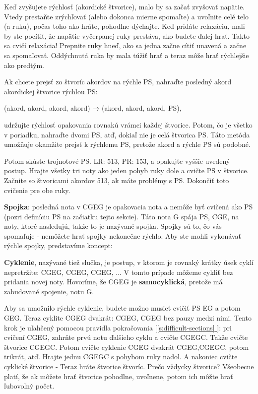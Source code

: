\documentclass[11pt,a4paper]{book}
\newcommand*{\fullref}[1]{\hyperref[{#1}]{\ref*{#1} \nameref*{#1}}} %
\newcommand*{\fullrefp}[1]{[\fullref{#1}]} %
\begin{document}
Keď zvyšujete rýchlosť (akordické štvorice), malo by sa začať zvyšovať napätie. Vtedy prestaňte zrýchľovať (alebo dokonca mierne spomaľte) a uvoľnite celé telo (a ruku), počas toho ako hráte, pohodlne dýchajte. Keď pridáte relaxáciu, mali by ste pocítiť, že napätie vyčerpanej ruky prestáva, ako budete ďalej hrať. Takto sa cvičí relaxácia! Prepnite ruky hneď, ako sa jedna začne cítiť unavená a začne sa spomaľovať. Oddýchnutá ruka by mala túžiť hrať a teraz môže hrať rýchlejšie ako predtým.

Ak chcete prejsť zo štvoríc akordov na rýchle PS, nahraďte posledný akord akordickej štvorice rýchlou PS:

(akord, akord, akord, akord) → (akord, akord, akord, PS),

udržujte rýchlosť opakovania rovnakú vrámci každej štvorice. Potom, čo je všetko v poriadku, nahraďte dvomi PS, atď, dokiaľ nie je celá štvorica PS. Táto metóda umožňuje okamžite prejsť k rýchlemu PS, pretože akord a rýchle PS sú podobné.

Potom skúste trojnotové PS. ĽR: 513, PR: 153, a opakujte vyššie uvedený postup. Hrajte všetky tri noty ako jeden pohyb ruky dole a cvičte PS v štvorice. Začnite so štvoricami akordov 513, ak máte problémy s PS. Dokončiť toto cvičenie pre obe ruky.

\textbf{Spojka}: posledná nota v CGEG je opakovacia nota a nemôže byť cvičená ako PS (pozri definíciu PS na začiatku tejto sekcie). Táto nota G spája PS, CGE, na noty, ktoré nasledujú, takže to je nazývané spojka. Spojky sú to, čo vás spomaľuje - nemôžete hrať spojky nekonečne rýchlo. Aby ste mohli vykonávať rýchle spojky, predstavíme koncept:

\textbf{Cyklenie}, nazývané tiež slučka, je postup, v ktorom je rovnaký krátky úsek cyklí nepretržite: CGEG, CGEG, CGEG, ... V tomto prípade môžeme cykliť bez pridania novej noty. Hovoríme, že CGEG je \textbf{samocyklická}, pretože má zabudované spojenie, notu G.

Aby sa umožnilo rýchle cyklenie, budete možno musieť cvičiť PS EG a potom GEG. Teraz cyklite CGEG dvakrát: CGEG, CGEG bez pauzy medzi nimi. Tento krok je uľahčený pomocou pravidla pokračovania \fullrefp{s:difficult-sections}: pri cvičení CGEG, zahrňte prvú notu ďalšieho cyklu a cvičte	 CGEGC. Takže cvičte štvorice CGEGC. Potom cvičte cyklenie CGEG dvakrát CGEG,CGEGC, potom trikrát, atď. Hrajte jednu CGEGC s pohybom ruky nadol. A nakoniec cvičte cyklické štvorice - Teraz hráte štvorice štvoríc. Prečo vždycky štvorice? Všeobecne platí, že ak môžete hrať štvorice pohodlne, uvoľnene, potom ich môžte hrať ľubovoľný počet.
\end{document}
